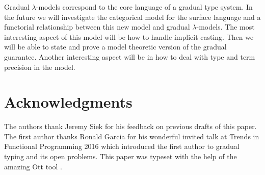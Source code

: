 \documentclass[sigplan]{acmart}\settopmatter{printfolios=true}
\begin{document}
Gradual $\lambda$-models correspond to the core language of a gradual
type system.  In the future we will investigate the categorical model
for the surface language and a functorial relationship between this
new model and gradual $\lambda$-models.  The most interesting aspect
of this model will be how to handle implicit casting.  Then we will be
able to state and prove a model theoretic version of the gradual
guarantee.  Another interesting aspect will be in how to deal with
type and term precision in the model.

\section{Acknowledgments}
\label{sec:acknowledgments}
The authors thank Jeremy Siek for his feedback on previous drafts of
this paper.  The first author thanks Ronald Garcia for his wonderful
invited talk at Trends in Functional Programming 2016 which introduced
the first author to gradual typing and its open problems.  This paper
was typeset with the help of the amazing Ott tool \cite{Sewell:2010}.





\appendix





\end{document}
